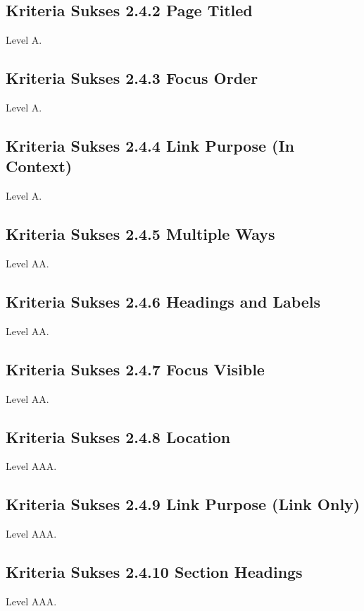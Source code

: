 \subsection{Kriteria Sukses 2.4.2 Page Titled}
\label{sec:kriteria_2.4.2}
Level A.

\subsection{Kriteria Sukses 2.4.3 Focus Order}
\label{sec:kriteria_2.4.3}
Level A.

\subsection{Kriteria Sukses 2.4.4 Link Purpose (In Context)}
\label{sec:kriteria_2.4.4}
Level A.

\subsection{Kriteria Sukses 2.4.5 Multiple Ways}
\label{sec:kriteria_2.4.5}
Level AA.

\subsection{Kriteria Sukses 2.4.6 Headings and Labels}
\label{sec:kriteria_2.4.6}
Level AA.

\subsection{Kriteria Sukses 2.4.7 Focus Visible}
\label{sec:kriteria_2.4.7}
Level AA.

\subsection{Kriteria Sukses 2.4.8 Location}
\label{sec:kriteria_2.4.8}
Level AAA.

\subsection{Kriteria Sukses 2.4.9 Link Purpose (Link Only)}
\label{sec:kriteria_2.4.9}
Level AAA.

\subsection{Kriteria Sukses 2.4.10 Section Headings}
\label{sec:kriteria_2.4.10}
Level AAA.

